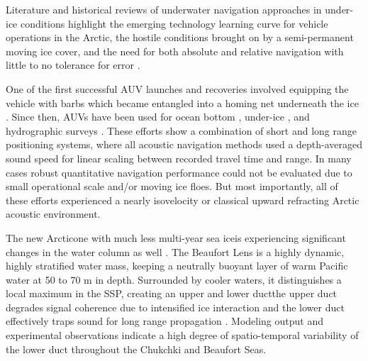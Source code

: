 Literature and historical reviews of underwater navigation approaches in under-ice conditions highlight the emerging technology learning curve for vehicle operations in the Arctic, the hostile conditions brought on by a semi-permanent moving ice cover, and the need for both absolute and relative navigation with little to no tolerance for error \citep{norgren_unmanned_2014,mcfarlane_autonomous_2015,barker_scientific_2020}.

One of the first successful AUV launches and recoveries involved equipping the vehicle with barbs which became entangled into a homing net underneath the ice \citep{bellingham_auv_1993}.
Since then, AUVs have been used for ocean bottom \citep{jakuba_long-baseline_2008,kunz_deep_2008}, under-ice \citep{kaminski_12_2010}, and hydrographic surveys \citep{kukulya_under-ice_2010,kukulya_development_2016,stevens_linking_2016,plueddemann_autonomous_2012}.
These efforts show a combination of short and long range positioning systems, where all acoustic navigation methods used a depth-averaged sound speed for linear scaling between recorded travel time and range.
In many cases robust quantitative navigation performance could not be evaluated due to small operational scale and/or moving ice floes.
But most importantly, all of these efforts experienced a nearly isovelocity or classical upward refracting Arctic acoustic environment.

The new Arctic\textemdash one with much less multi-year sea ice\textemdash is experiencing significant changes in the water column as well \citep{mackinnon_warm_2021}.
The Beaufort Lens is a highly dynamic, highly stratified water mass, keeping a neutrally buoyant layer of warm Pacific water at 50 to 70 m in depth.
Surrounded by cooler waters, it distinguishes a local maximum in the SSP, creating an upper and lower duct\textemdash the upper duct degrades signal coherence due to intensified ice interaction and the lower duct effectively traps sound for long range propagation \citep{poulsen_acoustic_2016}. 
Modeling output \citep{duda_long-range_2019,duda_effects_2021} and experimental observations \cite{kucukosmanoglu_observations_2021,badiey_azimuthal_2019,ballard_temporal_2020} indicate a high degree of spatio-temporal variability of the lower duct throughout the Chukchki and Beaufort Seas.

